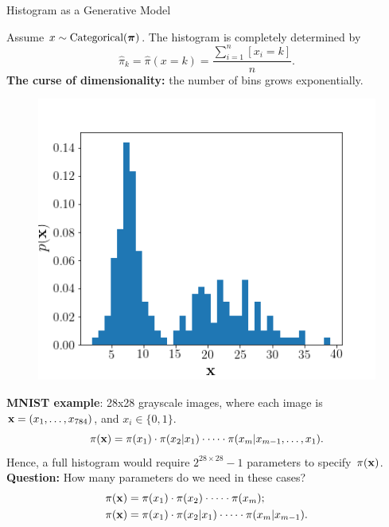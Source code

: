 \documentclass{beamer}
\begin{document}
\begin{frame}{Histogram as a Generative Model}
	
	\begin{minipage}[t]{0.6\columnwidth}
	    Assume $x \sim \textrm{Categorical}(\boldsymbol{\pi})$. The histogram is completely determined by
		$$
		    \hat{\pi}_k = \hat{\pi}(x = k) = \frac{\sum_{i=1}^n [x_i = k]}{n}.
		$$
		\textbf{The curse of dimensionality:} the number of bins grows exponentially. \\
		\end{minipage}%
		\begin{minipage}[t]{0.4\columnwidth}
	    \begin{figure}[h]
	        \centering
	        \includegraphics[width=\linewidth]{figs/histogram.png}
	    \end{figure}
	\end{minipage}
	\textbf{MNIST example}: 28x28 grayscale images, where each image is $\mathbf{x} = (x_1, \dots, x_{784})$, and $x_i \in \{0, 1\}$. 
	$$
	    \pi(\mathbf{x}) = \pi(x_1) \cdot \pi(x_2 | x_1) \cdot \dots \cdot \pi(x_m | x_{m-1}, \dots, x_1).
	$$
	Hence, a full histogram would require $2^{28 \times 28} - 1$ parameters to specify~$\pi(\mathbf{x})$. \\
	\textbf{Question:} How many parameters do we need in these cases?
	\begin{align*}
	    \pi(\mathbf{x}) &= \pi(x_1) \cdot \pi(x_2)\cdot \dots \cdot \pi(x_m); \\
	    \pi(\mathbf{x}) &= \pi(x_1) \cdot \pi(x_2 | x_1) \cdot \dots \cdot \pi(x_m | x_{m-1}).
	\end{align*}
\end{frame}
\end{document}
